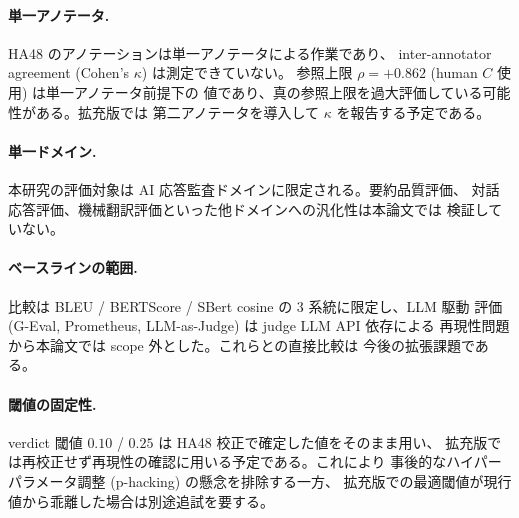 \paragraph{単一アノテータ.}
HA48 のアノテーションは単一アノテータによる作業であり、
inter-annotator agreement (Cohen's $\kappa$) は測定できていない。
参照上限 $\rho = +0.862$ (human $C$ 使用) は単一アノテータ前提下の
値であり、真の参照上限を過大評価している可能性がある。拡充版では
第二アノテータを導入して $\kappa$ を報告する予定である。

\paragraph{単一ドメイン.}
本研究の評価対象は AI 応答監査ドメインに限定される。要約品質評価、
対話応答評価、機械翻訳評価といった他ドメインへの汎化性は本論文では
検証していない。

\paragraph{ベースラインの範囲.}
比較は BLEU / BERTScore / SBert cosine の 3 系統に限定し、LLM 駆動
評価 (G-Eval, Prometheus, LLM-as-Judge) は judge LLM API 依存による
再現性問題から本論文では scope 外とした。これらとの直接比較は
今後の拡張課題である。

\paragraph{閾値の固定性.}
verdict 閾値 $0.10$ / $0.25$ は HA48 校正で確定した値をそのまま用い、
拡充版では再校正せず再現性の確認に用いる予定である。これにより
事後的なハイパーパラメータ調整 (p-hacking) の懸念を排除する一方、
拡充版での最適閾値が現行値から乖離した場合は別途追試を要する。
